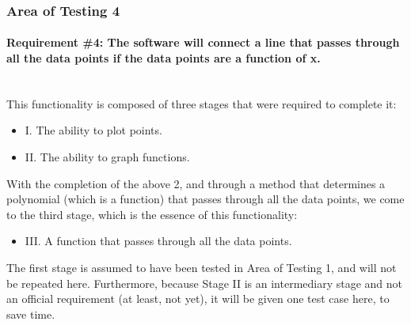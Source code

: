 \documentclass[12pt, titlepage]{article}
\begin{document}
\subsubsection{Area of Testing 4}		
	\paragraph{Requirement \#4: The software will connect a line that passes through all the data points if the data points are a function of x.\\\\}
	
	This functionality is composed of three stages that were required to complete it: 
	\begin{itemize}[label={ }]
		\item I. The ability to plot points. 
		\item	II. The ability to graph functions. 
	\end{itemize}	 
With the completion of the above 2, and through a method that determines a polynomial (which is a function) that passes through all the data points, we come to the third stage, which is the essence of this functionality: 
	\begin{itemize}[label={ }]
		\item III. A function that passes through all the data points.
		\end{itemize}
		The first stage is assumed to have been tested in Area of Testing 1, and will not be repeated here. Furthermore, because Stage II is an intermediary stage and not an official requirement (at least, not yet), it will be given one test case here, to save time.  
\end{document}
